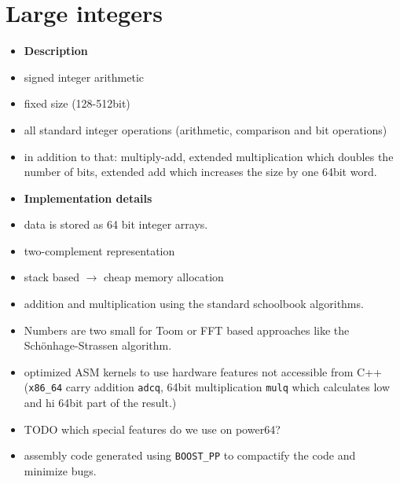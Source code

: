 \documentclass[oribibl]{llncs2e/llncs}
\begin{document}

\section{Large integers}
\begin{itemize}
\item {\bf Description}
\item signed integer arithmetic
\item fixed size (128-512bit)
\item all standard integer operations (arithmetic, comparison and bit operations)
\item in addition to that: multiply-add, extended multiplication which doubles the number of bits, extended add which increases the size by one 64bit word.
\item {\bf Implementation details}
\item data is stored as 64 bit integer arrays.
\item two-complement representation
\item stack based $\rightarrow$ cheap memory allocation
\item addition and multiplication using the standard schoolbook algorithms.
\item Numbers are two small for Toom\cite{Toom} or FFT based approaches like the Sch\"onhage-Strassen algorithm\cite{Schonhage}.
\item optimized ASM kernels to use hardware features not accessible from C++ (\verb|x86_64| carry addition \verb|adcq|, 64bit multiplication \verb|mulq| which calculates low and hi 64bit part of the result.)
\item TODO which special features do we use on power64?
\item assembly code generated using \verb|BOOST_PP| to compactify the code and minimize bugs.
\end{itemize}
\end{document}
